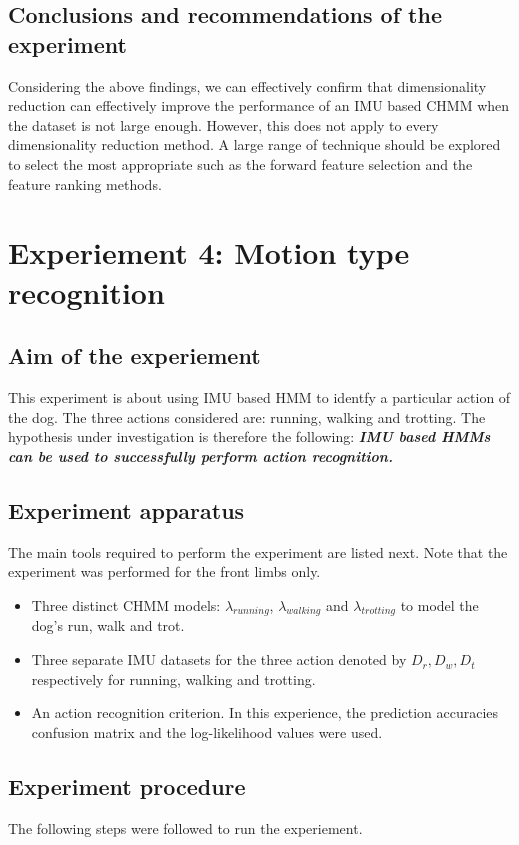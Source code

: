 \subsection{Conclusions and recommendations of the experiment}
Considering the above findings, we can effectively confirm that dimensionality reduction can effectively improve the performance of an IMU based CHMM when the dataset is not large enough. However, this does not apply to every dimensionality reduction method. A large range of technique should be explored to select the most appropriate such as the forward feature selection and the feature ranking methods.

\newpage
\section{Experiement 4: Motion type recognition}  \label{exp:motion}

\subsection{Aim of the experiement}
This experiment is about using IMU based HMM to identfy a particular action of the dog. The three actions considered are: running, walking and trotting.
The hypothesis under investigation is therefore the following:
\textbf{\textit{IMU based HMMs can be used to successfully perform action recognition.}}

\subsection{Experiment apparatus}
The main tools required to perform the experiment are listed next. Note that the experiment was performed for the front limbs only.
\begin{itemize}
	\item Three distinct CHMM models: \(\lambda_{running}\), \(\lambda_{walking}\) and \(\lambda_{trotting}\) to model the dog's run, walk and trot.
	\item Three separate IMU datasets for the three action denoted by \(D_r, D_w, D_t\) respectively for running, walking and trotting.
	\item An action recognition criterion. In this experience, the prediction accuracies confusion matrix and the log-likelihood values were used.
\end{itemize}

\subsection{Experiment procedure}
The following steps were followed to run the experiement.

